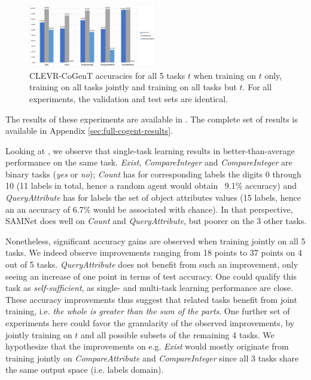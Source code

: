\begin{figure}[!t]
	\centering
	\includegraphics[width=0.5\textwidth]{img/charts/CoGenT_results.pdf}
	\caption{CLEVR-CoGenT accuracies for all 5 tasks $t$ when training on $t$ only, training on all tasks jointly and training on all tasks but $t$. For all experiments, the validation and test sets are identical.}
	\label{fig:CoGenT-results}
\end{figure}

The results of these experiments are available in . The complete set of results is available in Appendix \ref{sec:full-cogent-results}.


Looking at , we observe that single-task learning results in better-than-average performance on the same task. \textit{Exist}, \textit{CompareInteger} and \textit{CompareInteger} are binary tasks (\textit{yes} or \textit{no}); \textit{Count} has for corresponding labels the digits 0 through 10 (11 labels in total, hence a random agent would obtain ~9.1\% accuracy) and \textit{QueryAttribute} has for labels the set of object attributes values (15 labels, hence an an accuracy of 6.7\% would be associated with chance). In that perspective, SAMNet does well on \textit{Count} and \textit{QueryAttribute}, but poorer on the 3 other tasks.

Nonetheless, significant accuracy gains are observed when training jointly on all 5 tasks. We indeed observe improvements ranging from 18 points to 37 points on 4 out of 5 tasks. \textit{QueryAttribute} does not benefit from such an improvement, only seeing an increase of one point in terms of test accuracy. One could qualify this task as \textit{self-sufficient}, as single- and multi-task learning performance are close.
These accuracy improvements thus suggest that related tasks benefit from joint training, i.e. \emph{the whole is greater than the sum of the parts}. One further set of experiments here could favor the granularity of the observed improvements, by jointly training on $t$ and all possible subsets of the remaining 4 tasks. We hypothesize that the improvements on e.g. \textit{Exist} would mostly originate from training jointly on \textit{CompareAttribute} and \textit{CompareInteger} since all 3 tasks share the same output space (i.e. labels domain).

